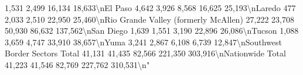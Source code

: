 \documentclass[
]{krantz}
\makeatletter
\newenvironment{Shaded}{\begin{snugshade}}{\end{snugshade}}
\newenvironment{kframe}{%
\medskip{}
\setlength{\fboxsep}{.8em}
 \def\at@end@of@kframe{}%
 \ifinner\ifhmode%
  \def\at@end@of@kframe{\end{minipage}}%
  \begin{minipage}{\columnwidth}%
 \fi\fi%
 \def\FrameCommand##1{\hskip\@totalleftmargin \hskip-\fboxsep
 \colorbox{shadecolor}{##1}\hskip-\fboxsep
     \hskip-\linewidth \hskip-\@totalleftmargin \hskip\columnwidth}%
 \MakeFramed {\advance\hsize-\width
   \@totalleftmargin\z@ \linewidth\hsize
   \@setminipage}}%
 {\par\unskip\endMakeFramed%
 \at@end@of@kframe}
\renewenvironment{Shaded}{\begin{kframe}}{\end{kframe}}
\makeatother
\begin{document}
\begin{Shaded}
\begin{Highlighting}[]
         1,531                2,499           16,134             18,633\textbackslash{}nEl Paso                                         4,642                     3,926                8,568           16,625             25,193\textbackslash{}nLaredo                                           477                      2,033                2,510           22,950             25,460\textbackslash{}nRio Grande Valley (formerly McAllen)           27,222                    23,708                50,930          86,632            137,562\textbackslash{}nSan Diego                                       1,639                     1,551                3,190           22,896             26,086\textbackslash{}nTucson                                          1,088                     3,659                4,747           33,910             38,657\textbackslash{}nYuma                                            3,241                     2,867                6,108            6,739             12,847\textbackslash{}nSouthwest Border Sectors Total                 41,131                    41,435                82,566         221,350            303,916\textbackslash{}nNationwide Total                               41,223                    41,546                82,769         227,762            310,531\textbackslash{}n"                                                                                                                                                                                                                                                                                                                                                                                                                                                                                                                                                                                                                                                                                                                                                                                                                                                                                                                                                                                                                                                                                                                                                                                                                                                                                                                                                                                                                                                                                                                                                                                                                                                                                                                                                                                                                                                                                                                                                                                                                                                                 
\end{Highlighting}
\end{Shaded}
\end{document}
